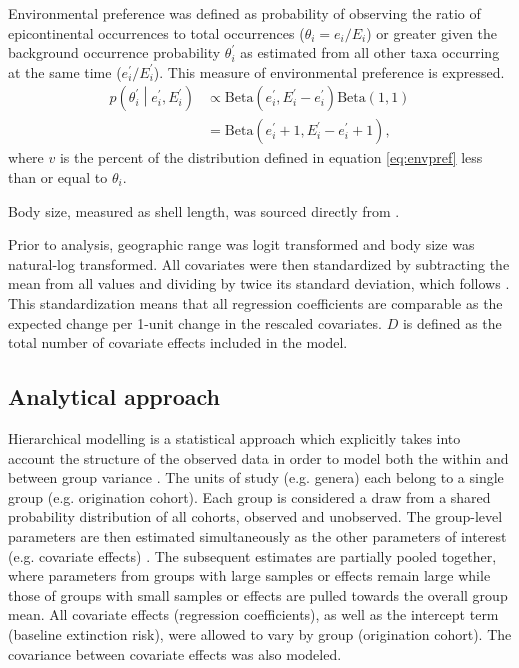 \documentclass{article}
\begin{document}
Environmental preference was defined as probability of observing the ratio of epicontinental occurrences to total occurrences (\(\theta_{i} = e_{i} / E_{i}\)) or greater given the background occurrence probability \(\theta^{\prime}_{i}\) as estimated from all other taxa occurring at the same time (\(e^{\prime}_{i} / E^{\prime}_{i}\)). This measure of environmental preference is expressed.
\begin{equation}
  \begin{aligned}
    p\left(\theta^{\prime}_{i} \middle| e^{\prime}_{i}, E^{\prime}_{i} \right) &\propto \mathrm{Beta}(e^{\prime}_{i}, E^{\prime}_{i} - e^{\prime}_{i}) \mathrm{Beta}(1, 1) \\
    &= \mathrm{Beta}(e^{\prime}_{i} + 1, E^{\prime}_{i} - e^{\prime}_{i} + 1),
  \end{aligned}
  \label{eq:envpref}
\end{equation}
where \(v\) is the percent of the distribution defined in equation \ref{eq:envpref} less than or equal to \(\theta_{i}\).

Body size, measured as shell length, was sourced directly from \citet{Payne2014}. %

Prior to analysis, geographic range was logit transformed and body size was natural-log transformed. All covariates were then standardized by subtracting the mean from all values and dividing by twice its standard deviation, which follows \citet{Gelman2007}. This standardization means that all regression coefficients are comparable as the expected change per 1-unit change in the rescaled covariates. \(D\) is defined as the total number of covariate effects included in the model.


\subsection{Analytical approach}

Hierarchical modelling is a statistical approach which explicitly takes into account the structure of the observed data in order to model both the within and between group variance \citep{Gelman2013d,Gelman2007}. The units of study (e.g. genera) each belong to a single group (e.g. origination cohort). Each group is considered a draw from a shared probability distribution of all cohorts, observed and unobserved. The group-level parameters are then estimated simultaneously as the other parameters of interest (e.g. covariate effects) \citep{Gelman2013d}. The subsequent estimates are partially pooled together, where parameters from groups with large samples or effects remain large while those of groups with small samples or effects are pulled towards the overall group mean. All covariate effects (regression coefficients), as well as the intercept term (baseline extinction risk), were allowed to vary by group (origination cohort). The covariance between covariate effects was also modeled. 
\end{document}
